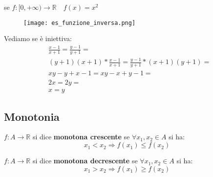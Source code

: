 \documentclass[../main.tex, class=article, 12pt]{subfiles}
\begin{document}
\begin{exmp}
        se $ f : [0, +\infty) \to \mathbb{R} \quad  f(x) = x^2$
        \begin{figure}[H]
          	\texttt{[image: es\_funzione\_inversa.png]}
          	\caption{}
                \label{fig:es_funzione_inversa}
        \end{figure}

        Vediamo se è iniettiva:
        \begin{align*}
                & \frac{x-1}{x+1} = \frac{y-1}{y+1} =  \\
                & (y+1)(x+1) * \frac{x-1}{x+1} = \frac{y-1}{y+1} * (x+1)(y+1) = \\
                & xy - y + x - 1 = xy - x + y - 1 = \\
                & 2x = 2y = \\
                & \boxed{x = y}
        \end{align*}
\end{exmp}



\newpage
\subsection{Monotonia}\label{sec:monotonia}
\begin{definition}
        $ f:A \to \mathbb{R} $ si dice \textbf{monotona crescente} se $ \forall x_1,x_2 \in A$ si ha:
        \begin{equation*}
                x_1 < x_2 \Rightarrow f(x_1) \le f(x_2)
        \end{equation*}
\end{definition}
\begin{definition}
        $ f:A \to \mathbb{R} $ si dice \textbf{monotona decrescente} se $ \forall x_1,x_2 \in A$ si ha:
        \begin{equation*}
                x_1 > x_2 \Rightarrow f(x_1) \ge f(x_2)
        \end{equation*}
\end{definition}
\end{document}
